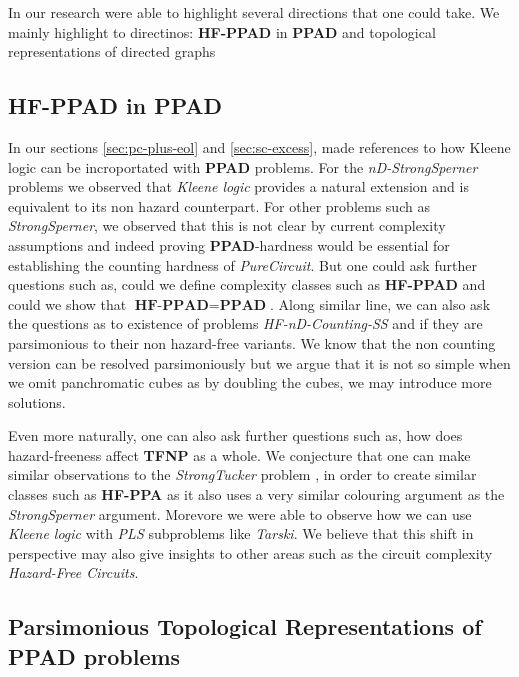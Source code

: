 
In our research were able to highlight several directions that one could take.
We mainly highlight to directinos: \textbf{HF-PPAD} in  \textbf{PPAD}
and topological representations of directed graphs

\subsection{\textbf{HF-PPAD} in  \textbf{PPAD}}

In our sections \ref{sec:pc-plus-eol} and \ref{sec:sc-excess}, made references to
how Kleene logic can be incroportated with \textbf{PPAD} problems. For
the \textit{nD-StrongSperner} problems we observed that \textit{Kleene logic}
provides a natural extension and is equivalent to its non hazard counterpart.
For other problems such as \textit{StrongSperner}, we observed that this
is not clear by current complexity assumptions and indeed proving \textbf{PPAD}-hardness
would be essential for establishing the counting hardness of \textit{PureCircuit}.
But one could ask further questions such as, could we define
complexity classes such as \textbf{HF-PPAD} and could we show that
$\textbf{HF-PPAD} = \textbf{PPAD}$.
Along similar line, we can also ask the questions as to existence of problems
\textit{HF-nD-Counting-SS} and if they are parsimonious to their non hazard-free variants.
We know that the non counting version can be resolved parsimoniously
but we argue that it is not so simple when we omit panchromatic cubes as by doubling
the cubes, we may introduce more solutions.


Even more naturally, one can also ask further questions such as, how does hazard-freeness
affect \textbf{TFNP} as a whole. We conjecture that one can make
similar observations to the \textit{StrongTucker} problem \cite{aisenberg_2DTuckerPPA_2020},
in order to create similar classes such as \textbf{HF-PPA} as
it also uses a very similar colouring argument as the \textit{StrongSperner} argument.
Morevore we were able to observe how we can use \textit{Kleene logic} with
\textit{PLS} subproblems like \textit{Tarski}. We believe that this shift
in perspective may also give insights to other areas such as the circuit complexity \textit{Hazard-Free Circuits}.


\subsection{Parsimonious Topological Representations of \textbf{PPAD} problems }


